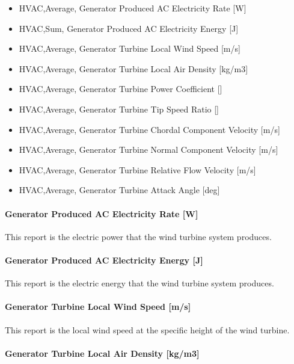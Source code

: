 \begin{itemize}
\item
  HVAC,Average, Generator Produced AC Electricity Rate {[}W{]}
\item
  HVAC,Sum, Generator Produced AC Electricity Energy {[}J{]}
\item
  HVAC,Average, Generator Turbine Local Wind Speed {[}m/s{]}
\item
  HVAC,Average, Generator Turbine Local Air Density {[}kg/m3{]}
\item
  HVAC,Average, Generator Turbine Power Coefficient {[]}
\item
  HVAC,Average, Generator Turbine Tip Speed Ratio {[]}
\item
  HVAC,Average, Generator Turbine Chordal Component Velocity {[}m/s{]}
\item
  HVAC,Average, Generator Turbine Normal Component Velocity {[}m/s{]}
\item
  HVAC,Average, Generator Turbine Relative Flow Velocity {[}m/s{]}
\item
  HVAC,Average, Generator Turbine Attack Angle {[}deg{]}
\end{itemize}

\paragraph{Generator Produced AC Electricity Rate {[}W{]}}\label{generator-produced-electric-power-w-4}

This report is the electric power that the wind turbine system produces.

\paragraph{Generator Produced AC Electricity Energy {[}J{]}}\label{generator-produced-electric-energy-j-4}

This report is the electric energy that the wind turbine system produces.

\paragraph{Generator Turbine Local Wind Speed {[}m/s{]}}\label{generator-turbine-local-wind-speed-ms}

This report is the local wind speed at the specific height of the wind turbine.

\paragraph{Generator Turbine Local Air Density {[}kg/m3{]}}\label{generator-turbine-local-air-density-kgm3}

